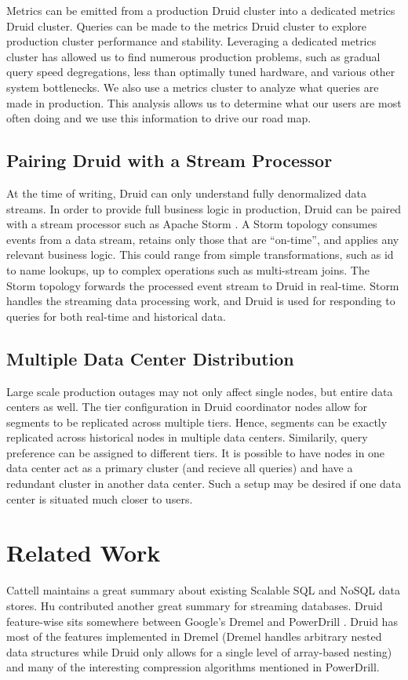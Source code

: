 \documentclass{acm_proc_article-sp}
\begin{document}
Metrics can be emitted from a production Druid cluster into a dedicated metrics
Druid cluster. Queries can be made to the metrics Druid cluster to explore
production cluster performance and stability. Leveraging a dedicated metrics
cluster has allowed us to find numerous production problems, such as gradual
query speed degregations, less than optimally tuned hardware, and various other
system bottlenecks. We also use a metrics cluster to analyze what queries are
made in production. This analysis allows us to determine what our users are
most often doing and we use this information to drive our road map.

\subsection{Pairing Druid with a Stream Processor}
At the time of writing, Druid can only understand fully denormalized data
streams. In order to provide full business logic in production, Druid can be
paired with a stream processor such as Apache Storm \cite{marz2013storm}. A
Storm topology consumes events from a data stream, retains only those that are
“on-time”, and applies any relevant business logic. This could range from
simple transformations, such as id to name lookups, up to complex operations
such as multi-stream joins. The Storm topology forwards the processed event
stream to Druid in real-time. Storm handles the streaming data processing work,
and Druid is used for responding to queries for both real-time and
historical data. 

\subsection{Multiple Data Center Distribution}
Large scale production outages may not only affect single nodes, but entire
data centers as well. The tier configuration in Druid coordinator nodes allow
for segments to be replicated across multiple tiers. Hence, segments can be
exactly replicated across historical nodes in multiple data centers.
Similarily, query preference can be assigned to different tiers. It is possible
to have nodes in one data center act as a primary cluster (and recieve all
queries) and have a redundant cluster in another data center. Such a setup may
be desired if one data center is situated much closer to users. 

\section{Related Work}
\label{sec:related}
Cattell \cite{cattell2011scalable} maintains a great summary about existing
Scalable SQL and NoSQL data stores. Hu \cite{hu2011stream} contributed another
great summary for streaming databases.  Druid feature-wise sits somewhere
between Google’s Dremel \cite{melnik2010dremel} and PowerDrill
\cite{hall2012processing}. Druid has most of the features implemented in Dremel
(Dremel handles arbitrary nested data structures while Druid only allows for a
single level of array-based nesting) and many of the interesting compression
algorithms mentioned in PowerDrill.
\end{document}
